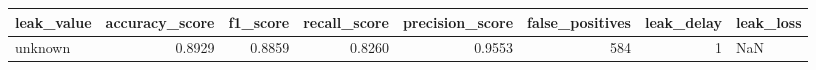 \begin{tabular}{lrrrrrrl}
\toprule
leak\_value & accuracy\_score & f1\_score & recall\_score & precision\_score & false\_positives & leak\_delay & leak\_loss \\
\midrule
unknown & 0.8929 & 0.8859 & 0.8260 & 0.9553 & 584 & 1 & NaN \\
\bottomrule
\end{tabular}
